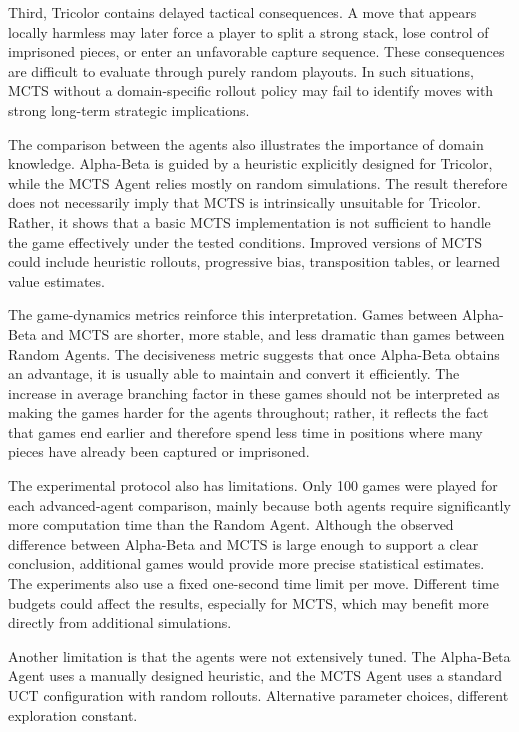 Third, Tricolor contains delayed tactical consequences. A move that appears locally harmless may later force a player to split a strong stack, lose control of imprisoned pieces, or enter an unfavorable capture sequence. These consequences are difficult to evaluate through purely random playouts. In such situations, MCTS without a domain-specific rollout policy may fail to identify moves with strong long-term strategic implications.

The comparison between the agents also illustrates the importance of domain knowledge. Alpha-Beta is guided by a heuristic explicitly designed for Tricolor, while the MCTS Agent relies mostly on random simulations. The result therefore does not necessarily imply that MCTS is intrinsically unsuitable for Tricolor. Rather, it shows that a basic MCTS implementation is not sufficient to handle the game effectively under the tested conditions. Improved versions of MCTS could include heuristic rollouts, progressive bias, transposition tables, or learned value estimates.

The game-dynamics metrics reinforce this interpretation. Games between Alpha-Beta and MCTS are shorter, more stable, and less dramatic than games between Random Agents. The decisiveness metric suggests that once Alpha-Beta obtains an advantage, it is usually able to maintain and convert it efficiently. The increase in average branching factor in these games should not be interpreted as making the games harder for the agents throughout; rather, it reflects the fact that games end earlier and therefore spend less time in positions where many pieces have already been captured or imprisoned.

The experimental protocol also has limitations. Only 100 games were played for each advanced-agent comparison, mainly because both agents require significantly more computation time than the Random Agent. Although the observed difference between Alpha-Beta and MCTS is large enough to support a clear conclusion, additional games would provide more precise statistical estimates. The experiments also use a fixed one-second time limit per move. Different time budgets could affect the results, especially for MCTS, which may benefit more directly from additional simulations.

Another limitation is that the agents were not extensively tuned. The Alpha-Beta Agent uses a manually designed heuristic, and the MCTS Agent uses a standard UCT configuration with random rollouts. Alternative parameter choices, different exploration constant.


